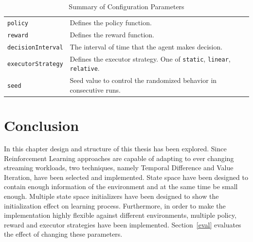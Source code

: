 \begin{table}[h]
\begin{tabularx}{\textwidth}{lX}
        \lstinline|policy| & Defines the policy function.\\
        \lstinline|reward| & Defines the reward function.\\
        \lstinline|decisionInterval| & The interval of time that the agent makes decision. \\
        \lstinline|executorStrategy| & Defines the executor strategy. One of \lstinline|static|, \lstinline|linear|, \lstinline|relative|. \\
        \lstinline|seed| & Seed value to control the randomized behavior in consecutive runs.\\
        \bottomrule
    \end{tabularx}
    \centering
    \caption{Summary of Configuration Parameters}
    \label{des:tab:config}
\end{table}

\newpage
\section{Conclusion}
\label{des:conc}

In this chapter design and structure of this thesis has been explored. Since Reinforcement Learning approaches are capable of adapting to ever changing streaming workloads, two techniques, namely Temporal Difference and Value Iteration, have been selected and implemented. State space have been designed to contain enough information of the environment and at the same time be small enough. Multiple state space initializers have been designed to show the initialization effect on learning process. Furthermore, in order to make the implementation highly flexible against different environments, multiple policy, reward and executor strategies have been implemented. Section~\ref{eval} evaluates the effect of changing these parameters. 